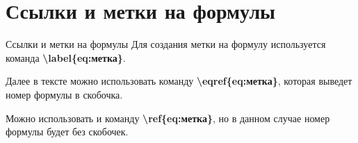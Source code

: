 \documentclass[aspectratio=169]{beamer}
\begin{document}
\section{Ссылки и метки на формулы}
\begin{frame}{Ссылки и метки на формулы}
    Для создания метки на формулу используется команда \textbf{\textbackslash label\{eq:метка\}}.

    Далее в тексте можно использовать команду \textbf{\textbackslash eqref\{eq:метка\}}, которая выведет номер формулы в скобочка.

    Можно использовать и команду \textbf{\textbackslash ref\{eq:метка\}}, но в данном случае номер формулы будет без скобочек.
\end{frame}
\end{document}
